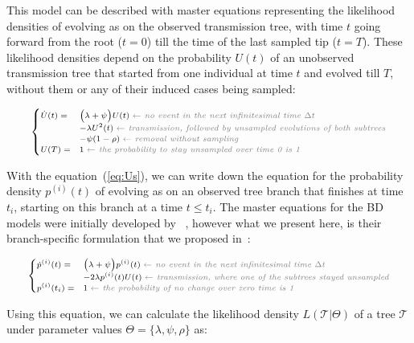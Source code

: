 \documentclass[a4paper,10pt]{article}
\begin{document}
This model can be described with master equations representing the likelihood densities of evolving as on the observed transmission tree, with time $t$ going forward from the root ($t=0$) till the time of the last sampled tip ($t=T$). These likelihood densities depend on the probability $U(t)$ of an unobserved transmission tree that started from one individual at time $t$ and evolved till $T$, without them or any of their induced cases being sampled: 

\begin{equation}
\scriptsize
\begin{cases}
\dot{U}(t) = &\Big(\lambda + \psi\Big) U(t)\; \textit{\color{gray} $\leftarrow$ no event in the next infinitesimal time $\Delta t$ }\\
    &- \lambda U^2(t) \;  \textit{\color{gray} $\leftarrow$ transmission, followed by unsampled evolutions of both subtrees}\\
    &- \psi (1 - \rho)\;  \textit{\color{gray} $\leftarrow$ removal without sampling}\\
U(T) = & 1\;  \textit{\color{gray} $\leftarrow$ the probability to stay unsampled over time 0 is 1} \label{eq:Us}
\end{cases}
\end{equation}


With the equation~(\ref{eq:Us}), we can write down the equation for the probability density $p^{(i)}(t)$ of evolving as on an observed tree branch that finishes at time $t_i$, starting on this branch at a time $t \leq t_i$. The master equations for the BD models were initially developed by ~\citet{Stadler2009}, however what we present here, is their branch-specific formulation that we proposed in~\citep{zhukovaFastAccurateMaximumLikelihood2022}:

\begin{equation}
\scriptsize
\begin{cases}
\dot{p}^{(i)}(t) = & \Big(\lambda + \psi\Big) p^{(i)}(t)\; \textit{\color{gray} $\leftarrow$ no event in the next infinitesimal time $\Delta t$ }\\
    & - 2 \lambda p^{(i)}(t)U(t)\;  \textit{\color{gray} $\leftarrow$ transmission, where one of the subtrees stayed unsampled}\\
p^{(i)}(t_i) =  &1\;  \textit{\color{gray} $\leftarrow$ the probability of no change over zero time is 1}
\end{cases}\label{eq:p}
\end{equation}

Using this equation, we can calculate the likelihood density $L(\mathscr{T}|\Theta)$ of a tree $\mathscr{T}$ under parameter values $\Theta = \{\lambda, \psi, \rho\}$ as:
\end{document}
